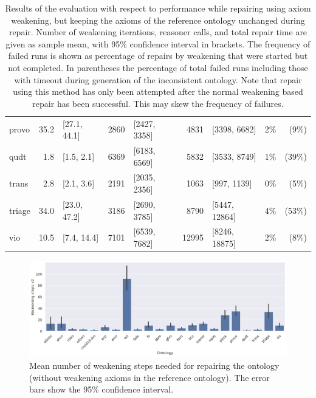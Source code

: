 \begin{table}[ht]
\begin{tabular}{|l|r@{ }lr@{ }lr@{ }lr@{ }r|}
    provo & 35.2 & [27.1, 44.1] & 2860 & [2427, 3358] & 4831 & [3398, 6682] & 2\% & (9\%) \\
    qudt & 1.8 & [1.5, 2.1] & 6369 & [6183, 6569] & 5832 & [3533, 8749] & 1\% & (39\%) \\
    trans & 2.8 & [2.1, 3.6] & 2191 & [2035, 2356] & 1063 & [997, 1139] & 0\% & (5\%) \\
    triage & 34.0 & [23.0, 47.2] & 3186 & [2690, 3785] & 8790 & [5447, 12864] & 4\% & (53\%) \\
    vio & 10.5 & [7.4, 14.4] & 7101 & [6539, 7682] & 12995 & [8246, 18875] & 2\% & (8\%) \\
    \hline
  \end{tabular}
  \caption{Results of the evaluation with respect to performance while repairing using axiom weakening, but keeping the axioms of the reference ontology unchanged during repair. Number of weakening iterations, reasoner calls, and total repair time are given as sample mean, with 95\% confidence interval in brackets. The frequency of failed runs is shown as percentage of repairs by weakening that were started but not completed. In parentheses the percentage of total failed runs including those with timeout during generation of the inconsistent ontology. Note that repair using this method has only been attempted after the normal weakening based repair has been successful. This may skew the frequency of failures.}
\end{table}

\begin{figure}[ht]
  \centering
  \includegraphics[width=\textwidth]{resources/steps-enhance-ontology-bar.png}
  \caption{Mean number of weakening steps needed for repairing the ontology (without weakening axioms in the reference ontology). The error bars show the 95\% confidence interval.}
\end{figure}

